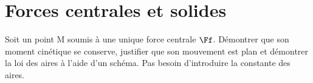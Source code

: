 \documentclass[a4paper, 10pt, final, garamond]{book}
\begin{document}
\setcounter{chapter}{19}


\chapter{Forces centrales et solides}

\begin{enumerate}[label=\sqenumi]
	Soit un point M soumis à une unique force centrale $\Ff$. Démontrer que son
	moment cinétique se conserve, justifier que son mouvement est plan et
	démontrer la loi des aires à l'aide d'un schéma. Pas besoin d'introduire la
	constante des aires.
	\smallbreak
	\begin{isd}
		\vspace{-15pt}
		\tcblower
		\begin{center}
\end{center}
\end{isd}
\end{enumerate}
\end{document}
